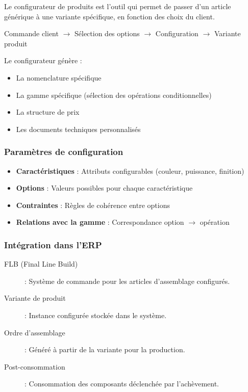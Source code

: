 \documentclass{article}
\begin{document}
Le configurateur de produits est l'outil qui permet de passer d'un article générique à une variante spécifique, en fonction des choix du client.

\begin{tcolorbox}[colback=blueclair, colframe=blue!70!black, title=Processus de configuration]
\begin{center}
Commande client $\rightarrow$ Sélection des options $\rightarrow$ Configuration $\rightarrow$ Variante produit
\end{center}
\vspace{0.5em}
Le configurateur génère :
\begin{itemize}
    \item La nomenclature spécifique
    \item La gamme spécifique (sélection des opérations conditionnelles)
    \item La structure de prix
    \item Les documents techniques personnalisés
\end{itemize}
\end{tcolorbox}

\subsubsection{Paramètres de configuration}

\begin{itemize}
    \item \textbf{Caractéristiques} : Attributs configurables (couleur, puissance, finition)
    \item \textbf{Options} : Valeurs possibles pour chaque caractéristique
    \item \textbf{Contraintes} : Règles de cohérence entre options
    \item \textbf{Relations avec la gamme} : Correspondance option $\rightarrow$ opération
\end{itemize}

\subsubsection{Intégration dans l'ERP}

\begin{description}
    \item[FLB (Final Line Build)] : Système de commande pour les articles d'assemblage configurés.
    \item[Variante de produit] : Instance configurée stockée dans le système.
    \item[Ordre d'assemblage] : Généré à partir de la variante pour la production.
    \item[Post-consommation] : Consommation des composants déclenchée par l'achèvement.
\end{description}
\end{document}
